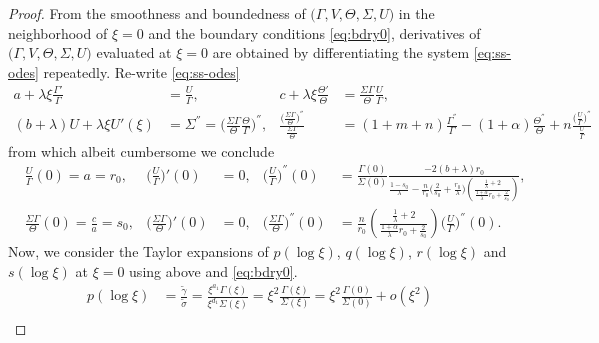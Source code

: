 \documentclass[a4paper,11pt]{article}
\def\tg{{\tilde{\gamma}}}
\def\ts{{\tilde{\sigma}}}
\begin{document}
\begin{proof}
From the smoothness and boundedness of $\big(\Gamma,V,\Theta,\Sigma,U\big)$ in the neighborhood of $\xi=0$ and the boundary conditions \eqref{eq:bdry0}, derivatives of $\big(\Gamma,V,\Theta,\Sigma,U\big)$ evaluated at $\xi=0$ are obtained by differentiating the system \eqref{eq:ss-odes} repeatedly. 
Re-write \eqref{eq:ss-odes}
\begin{align*}
  a + \lambda\xi\frac{\Gamma'}{\Gamma} &= \frac{U}{\Gamma}, &
  c + \lambda\xi\frac{\Theta'}{\Theta} &= \frac{\Sigma\Gamma}{\Theta} \frac{U}{\Gamma},\\
  (b+\lambda)U  + \lambda \xi U'(\xi) &= \Sigma^{''} = \Big(\frac{\Sigma\Gamma}{\Theta} \frac{\Theta}{\Gamma}\Big)^{''}, &
  \frac{\Big(\frac{\Sigma\Gamma}{\Theta}\Big)^{''}}{\frac{\Sigma\Gamma}{\Theta}} &= (1+m+n)\frac{\Gamma^{''}}{\Gamma}-(1+\alpha) \frac{\Theta^{''}}{\Theta} + n \frac{ \big(\frac{U}{\Gamma}\big)^{''}}{\frac{U}{\Gamma}}
\end{align*}
from which albeit cumbersome we conclude
\begin{align*}
&\frac{U}{\Gamma}(0) = a = r_0,  & \Big(\frac{U}{\Gamma}\Big)'(0)&=0, & \Big(\frac{U}{\Gamma}\Big)^{''}(0) &= \frac{\Gamma(0)}{\Sigma(0)} \frac{-2(b+\lambda)r_0}{\frac{1-s_0}{\lambda}-\frac{n}{r_0}\Big(\frac{2}{s_0} + \frac{r_0}{\lambda}\Big)\left(\frac{ \frac{1}{\lambda}+2}{ \frac{1+\alpha}{\lambda}r_0 + \frac{2}{s_0}}\right)},\\
&\frac{\Sigma\Gamma}{\Theta}(0) = \frac{c}{a} = s_0,  & \Big(\frac{\Sigma\Gamma}{\Theta}\Big)'(0)&=0, &
\Big(\frac{\Sigma\Gamma}{\Theta}\Big)^{''}(0) &= \frac{n}{r_0} \left(\frac{ \frac{1}{\lambda}+2 }{ \frac{1+\alpha}{\lambda}r_0 + \frac{2}{s_0}}\right)\Big(\frac{U}{\Gamma}\Big)^{''}(0).
\end{align*}
Now, we consider the Taylor expansions of $p(\log\xi)$, $q(\log\xi)$, $r(\log\xi)$ and $s(\log\xi)$ at $\xi=0$ using above and \eqref{eq:bdry0}.
\begin{align*}
 p(\log\xi) &= \frac{ \tg }{\ts} = \frac{ \xi^{a_1} \Gamma(\xi)}{\xi^{d_1} \Sigma(\xi)} = \xi^2\frac{\Gamma(\xi)}{\Sigma(\xi)} = \xi^2\frac{\Gamma(0)}{\Sigma(0)} + o(\xi^2) \\

\end{align*}
\end{proof}
\end{document}

